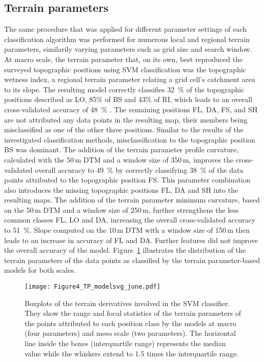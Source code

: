 \documentclass[preprint,12pt,authoryear]{elsarticle}
\begin{document}
\subsection{Terrain parameters}
The same procedure that was applied for different parameter settings of each classification algorithm was performed for  numerous local and regional terrain parameters, similarily varying parameters such as grid size and search window. At macro scale, the terrain parameter that, on its own, best reproduced the surveyed topographic positions using SVM classification was the topographic wetness index, a regional terrain parameter relating a grid cell's catchment area to its slope. The resulting model correctly classifies 32~\% of the topographic positions described as LO, 85\% of BS and 43\% of RI, which leads to an overall cross-validated accuracy of 48~\% . The remaining positions FL, DA, FS, and SH are not attributed any data points in the resulting map, their members being misclassified as one of the other three positions. Similar to the results of the investigated classification methods, misclassification to the topographic position BS was dominant. The addition of the terrain parameter profile curvature, calculated with the 50\,m DTM and a window size of 350\,m, improves the cross-validated overall accuracy to 49~\% by correctly classifying 38~\% of the data points attributed to the topographic position FS. This parameter combination also introduces the missing topographic positions FL, DA and SH into the resulting maps. The addition of the terrain parameter minimum curvature, based on the 50\,m DTM and a window size of 250\,m, further strengthens the less common classes FL, LO and DA, increasing the overall cross-validated accuracy to 51~\%. Slope computed on the 10\,m DTM with a window size of 150\,m then leads to an increase in accuracy of FL and DA. Further features did not improve the overall accuracy of the model. Figure~\ref{fig:tp_model} illustrates the distribution of the terrain parameters of the data points as classified by the terrain parameter-based models for both scales.

\begin{figure}
\texttt{[image: Figure4\_TP\_modelsvg\_june.pdf]}
\caption{Boxplots of the terrain derivatives involved in the SVM classifier. They show the range and focal statistics of the terrain parameters of the points attributed to each position class by the models at macro (four parameters) and meso scale (two parameters). The horizontal line inside the boxes (interquartile range) represents the median value while the whiskers extend to 1.5 times the interquartile range.}
\label{fig:tp_model}
\end{figure}
\end{document}
